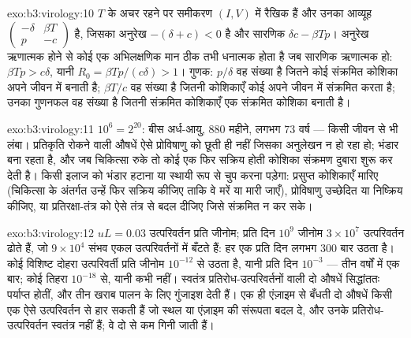 \begin{solution}{exo:b3:virology:10}
$T$ के अचर रहने पर समीकरण $(I, V)$ में रैखिक हैं और उनका आव्यूह
$\begin{pmatrix} -\delta & \beta T \\ p & -c \end{pmatrix}$ है, जिसका अनुरेख
$-(\delta + c) < 0$ है और सारणिक $\delta c - \beta Tp$। अनुरेख
ऋणात्मक होने से कोई एक अभिलक्षणिक मान ठीक तभी धनात्मक होता है जब
सारणिक ऋणात्मक हो: $\beta Tp > c\delta$, यानी $R_{0} = \beta
Tp/(c\delta) > 1$। गुणक: $p/\delta$ वह संख्या है जितने  कोई
संक्रमित कोशिका अपने जीवन में बनाती है; $\beta T/c$ वह संख्या है जितनी
कोशिकाएँ कोई  अपने जीवन में संक्रमित करता है; उनका गुणनफल वह
संख्या है जितनी संक्रमित कोशिकाएँ एक संक्रमित कोशिका बनाती है।
\end{solution}

\begin{solution}{exo:b3:virology:11}
$10^{6} = 2^{20}$: बीस अर्ध-आयु, $880$ महीने, लगभग $73$ वर्ष ---
किसी जीवन से भी लंबा। प्रतिकृति रोकने वाली औषधें ऐसे प्रोविषाणु को
छूती ही नहीं जिसका अनुलेखन न हो रहा हो; भंडार बना रहता है, और जब
चिकित्सा रुके तो कोई एक फिर सक्रिय होती कोशिका संक्रमण दुबारा शुरू कर
देती है। किसी इलाज को भंडार हटाना या स्थायी रूप से चुप करना पड़ेगा:
प्रसुप्त कोशिकाएँ मारिए (चिकित्सा के अंतर्गत उन्हें फिर सक्रिय कीजिए
ताकि वे मरें या मारी जाएँ), प्रोविषाणु उच्छेदित या निष्क्रिय कीजिए, या
प्रतिरक्षा-तंत्र को ऐसे तंत्र से बदल दीजिए जिसे  संक्रमित न कर सके।
\end{solution}

\begin{solution}{exo:b3:virology:12}
$uL = 0.03$ उत्परिवर्तन प्रति जीनोम; प्रति दिन $10^{9}$ जीनोम $3\times
10^{7}$ उत्परिवर्तन ढोते हैं, जो $9\times 10^{4}$ संभव एकल
उत्परिवर्तनों में बँटते हैं: हर एक प्रति दिन लगभग $300$ बार उठता है।
कोई विशिष्ट दोहरा उत्परिवर्ती प्रति जीनोम
$10^{-12}$ से उठता है, यानी प्रति दिन $10^{-3}$ --- तीन वर्षों में एक बार; कोई
तिहरा $10^{-18}$ से, यानी कभी नहीं। स्वतंत्र प्रतिरोध-उत्परिवर्तनों
वाली दो औषधें सिद्धांततः पर्याप्त होतीं, और तीन खराब पालन के लिए
गुंजाइश देती हैं। एक ही एंज़ाइम से बँधती दो औषधें किसी एक ऐसे
उत्परिवर्तन से हार सकती हैं जो स्थल या एंज़ाइम की संरूपता बदल दे, और
उनके प्रतिरोध-उत्परिवर्तन स्वतंत्र नहीं हैं; वे दो से कम गिनी जाती हैं।
\end{solution}

